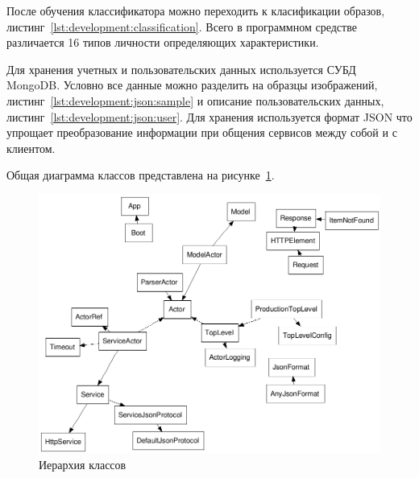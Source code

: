 После обучения классификатора можно переходить к класификации образов, листинг~\ref{lst:development:classification}. Всего в программном средстве различается 16 типов личности определяющих характеристики.



Для хранения учетных и пользовательских данных используется СУБД MongoDB. Условно все данные можно разделить на образцы изображений, листинг~\ref{lst:development:json:sample} и описание пользовательских данных, листинг~\ref{lst:development:json:user}. Для хранения используется формат JSON что упрощает преобразование информации при общения сервисов между собой и с клиентом. 





Общая диаграмма классов представлена на рисунке~\ref{fig:develoipment:class_fdp}.
\begin{figure}[ht]
    \centering
    \label{fig:develoipment:class_fdp}
    \includegraphics[width=1\textwidth]{figures/classes-fdp.png}
    \caption{Иерархия классов}
\end{figure}